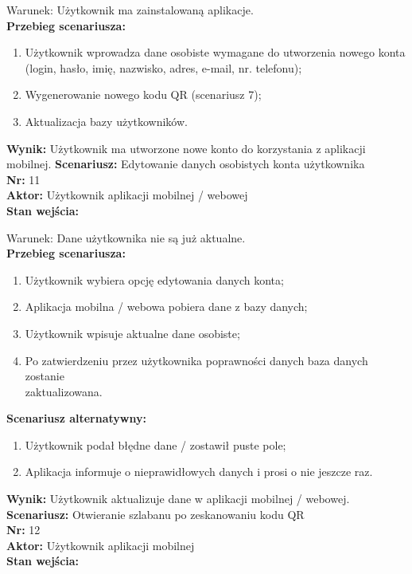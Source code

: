 \documentclass[12pt,a4paper]{article}
\begin{document}
Warunek: Użytkownik ma zainstalowaną aplikacje.
\\{\bf Przebieg scenariusza:}
\begin{enumerate}
\item Użytkownik wprowadza dane osobiste wymagane do utworzenia nowego konta (login, hasło, imię, nazwisko, adres, e-mail, nr. telefonu);
\item Wygenerowanie nowego kodu QR (scenariusz 7);
\item Aktualizacja bazy użytkowników.
\end{enumerate}
{\bf Wynik:} Użytkownik ma utworzone nowe konto do korzystania z aplikacji mobilnej.
\newline\newline
{\large \bf Scenariusz:} Edytowanie danych osobistych konta użytkownika
\\{\bf Nr:} 11
\\{\bf Aktor:} Użytkownik aplikacji mobilnej / webowej
\\{\bf Stan wejścia:}

Warunek: Dane użytkownika nie są już aktualne.
\\{\bf Przebieg scenariusza:}
\begin{enumerate}
\item Użytkownik wybiera opcję edytowania danych konta;
\item Aplikacja mobilna / webowa pobiera dane z bazy danych;
\item Użytkownik wpisuje aktualne dane osobiste;
\item Po zatwierdzeniu przez użytkownika poprawności danych baza danych zostanie\\zaktualizowana.
\end{enumerate}
{\bf Scenariusz alternatywny:}
\begin{enumerate}
\item Użytkownik podał błędne dane / zostawił puste pole;
\item Aplikacja informuje o nieprawidłowych danych i prosi o nie jeszcze raz.
\end{enumerate}
{\bf Wynik:} Użytkownik aktualizuje dane w aplikacji mobilnej / webowej.
\newline\newline\newline\newline\newline\newline\newline\newline\newline\newline\newline\newline
{\large \bf Scenariusz:} Otwieranie szlabanu po zeskanowaniu kodu QR
\\{\bf Nr:} 12
\\{\bf Aktor:} Użytkownik aplikacji mobilnej
\\{\bf Stan wejścia:}
\end{document}

